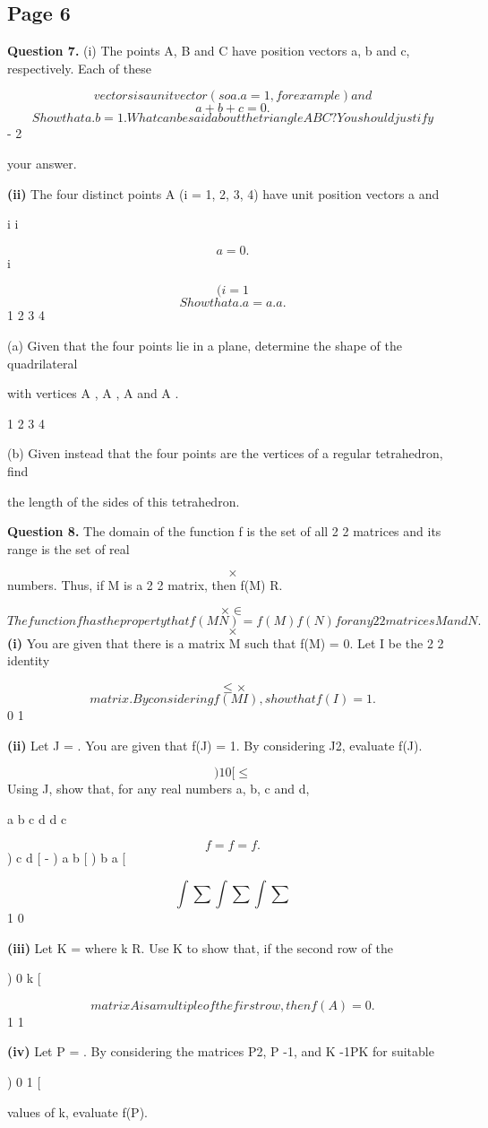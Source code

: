 \documentclass[12pt]{article}
\begin{document}
\subsection*{Page 6}
\begin{flushleft}
\bigskip\textbf{Question 7.} (i) The points A, B and C have position vectors a, b and c, respectively. Each of these\par
\[vectors is a unit vector (so a . a = 1 , for example) and\]
\[a + b + c = 0.\]
\[Show that a . b = 1 . What can be said about the triangle ABC? You should justify\]
- 2\par
your answer.\par
\textbf{(ii)} The four distinct points A (i = 1, 2, 3, 4) have unit position vectors a and\par
i i\par
\[a = 0.\]
i\par
\[(i=1\]
\[Show that a . a = a . a .\]
1 2 3 4\par
(a) Given that the four points lie in a plane, determine the shape of the quadrilateral\par
with vertices A , A , A and A .\par
1 2 3 4\par
(b) Given instead that the four points are the vertices of a regular tetrahedron, find\par
the length of the sides of this tetrahedron.\par
\bigskip\textbf{Question 8.} The domain of the function f is the set of all 2 2 matrices and its range is the set of real\par
\[\times\]
numbers. Thus, if M is a 2 2 matrix, then f(M) R.\par
\[\times \in\]
\[The function f has the property that f(MN) = f(M)f(N) for any 2 2 matrices M and N.\]
\[\times\]
\textbf{(i)} You are given that there is a matrix M such that f(M) = 0. Let I be the 2 2 identity\par
\[\leq \times\]
\[matrix. By considering f(MI), show that f(I) = 1.\]
0 1\par
\textbf{(ii)} Let J = . You are given that f(J) = 1. By considering J2, evaluate f(J).\par
\[) 1 0 [ \leq\]
Using J, show that, for any real numbers a, b, c and d,\par
a b c d d c\par
\[f = f = f .\]
) c d [ - ) a b [ ) b a [\par
\[\int \sum \int \sum \int \sum\]
1 0\par
\textbf{(iii)} Let K = where k R. Use K to show that, if the second row of the\par
) 0 k [ \in\par
\[matrix A is a multiple of the first row, then f(A) = 0.\]
1 1\par
\textbf{(iv)} Let P = . By considering the matrices P2, P -1, and K -1PK for suitable\par
) 0 1 [\par
values of k, evaluate f(P).\par
\end{flushleft}
\end{document}
